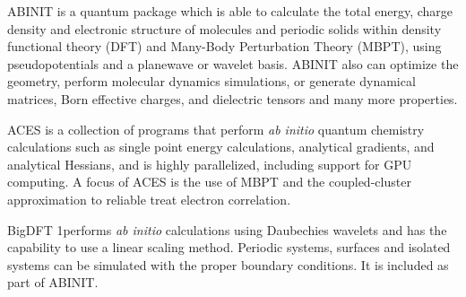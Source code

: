 ABINIT \cite{Gonze_2009} is a quantum package which is able to calculate the total energy, charge density and electronic structure of molecules and periodic solids within density functional theory (DFT) and Many-Body Perturbation Theory (MBPT), using pseudopotentials and a planewave or wavelet basis. ABINIT also can optimize the geometry, perform molecular dynamics simulations, or generate dynamical matrices, Born effective charges, and dielectric tensors and many more properties. 

ACES \cite{Lotrich_2008} is a collection of programs that perform \textit{ab initio} quantum chemistry calculations such as single point energy calculations, analytical gradients, and analytical Hessians, and is highly parallelized, including support for GPU computing.
A focus of ACES is the use of MBPT and the coupled-cluster approximation to reliable treat electron correlation.

BigDFT \cite{Genovese_2008,Mohr_2014,Mohr_2015} 1performs \textit{ab initio} calculations using Daubechies wavelets and has the capability to use a linear scaling method.  Periodic systems, surfaces and isolated systems can be simulated with the proper boundary conditions. It is included as part of ABINIT.
